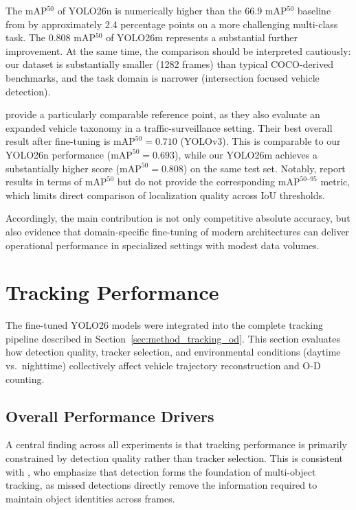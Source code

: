 The mAP$^{50}$ of YOLO26n is numerically higher than the 66.9 mAP$^{50}$ baseline from \cite{YOLO-PEL} by approximately 2.4 percentage points on a more challenging multi-class task. The 0.808 mAP$^{50}$ of YOLO26m represents a substantial further improvement. At the same time, the comparison should be interpreted cautiously: our dataset is substantially smaller (1282 frames) than typical COCO-derived benchmarks, and the task domain is narrower (intersection focused vehicle detection).

\citet{Neupane2022RealTimeVehicle} provide a particularly comparable reference point, as they also evaluate an expanded vehicle taxonomy in a traffic-surveillance setting. Their best overall result after fine-tuning is $\mathrm{mAP}^{50}=0.710$ (YOLOv3). This is comparable to our YOLO26n performance ($\mathrm{mAP}^{50}=0.693$), while our YOLO26m achieves a substantially higher score ($\mathrm{mAP}^{50}=0.808$) on the same test set. Notably, \citet{Neupane2022RealTimeVehicle} report results in terms of $\mathrm{mAP}^{50}$ but do not provide the corresponding $\mathrm{mAP}^{50\text{--}95}$ metric, which limits direct comparison of localization quality across IoU thresholds.

Accordingly, the main contribution is not only competitive absolute accuracy, but also evidence that domain-specific fine-tuning of modern architectures can deliver operational performance in specialized settings with modest data volumes.

\section{Tracking Performance}

The fine-tuned YOLO26 models were integrated into the complete tracking pipeline described in Section~\ref{sec:method_tracking_od}. This section evaluates how detection quality, tracker selection, and environmental conditions (daytime vs.\ nighttime) collectively affect vehicle trajectory reconstruction and O-D counting.

\subsection{Overall Performance Drivers}

A central finding across all experiments is that tracking performance is primarily constrained by detection quality rather than tracker selection. This is consistent with \citet{Hassan2024}, who emphasize that detection forms the foundation of multi-object tracking, as missed detections directly remove the information required to maintain object identities across frames.

